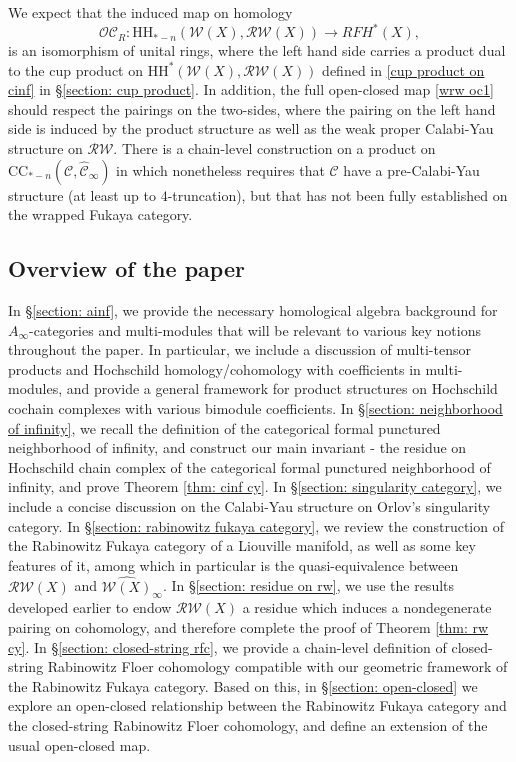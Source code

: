 \documentclass[11pt]{amsproc}
\def\w{\mathcal{W}(E)}
\def\cc{\mathcal{C}}
\def\oc{\mathcal{OC}}
\def\r#1{\mathrm{#1}}
\def\w{\mathcal{W}}
\def\rw{\mathcal{RW}}
\def\ainf{A_\infty}
\def\cinf{\widehat{\cc}_{\infty}}
\theoremstyle{remark}
\numberwithin{equation}{section}
\begin{document}
We expect that the induced map on homology 
\begin{equation}
\oc_{R}: \r{HH}_{*-n}(\w(X), \rw(X)) \to RFH^{*}(X),
\end{equation}
is an isomorphism of unital rings,
where the left hand side carries a product dual to the cup product on $\r{HH}^{*}(\w(X), \rw(X))$ defined in \eqref{cup product on cinf} in \S\ref{section: cup product}.
In addition, the full open-closed map \eqref{wrw oc1} should respect the pairings on the two-sides,
where the pairing on the left hand side is induced by the product structure as well as the weak proper Calabi-Yau structure on $\rw$.
There is a chain-level construction on a product on $\r{CC}_{*-n}(\cc, \cinf)$ in \cite{rivera-takeda-wang} which nonetheless requires that $\cc$ have a pre-Calabi-Yau structure (at least up to $4$-truncation),
but that has not been fully established on the wrapped Fukaya category.

\subsection*{Overview of the paper}

In \S\ref{section: ainf}, we provide the necessary homological algebra background for $\ainf$-categories and multi-modules that will be relevant to various key notions throughout the paper.
In particular, we include a discussion of multi-tensor products and Hochschild homology/cohomology with coefficients in multi-modules,
and provide a general framework for product structures on Hochschild cochain complexes with various bimodule coefficients.
In \S\ref{section: neighborhood of infinity}, we recall the definition of the categorical formal punctured neighborhood of infinity, 
and construct our main invariant - the residue on Hochschild chain complex of the categorical formal punctured neighborhood of infinity,
and prove Theorem \ref{thm: cinf cy}.
In \S\ref{section: singularity category}, we include a concise discussion on the Calabi-Yau structure on Orlov's singularity category.
In \S\ref{section: rabinowitz fukaya category}, we review the construction of the Rabinowitz Fukaya category of a Liouville manifold,
as well as some key features of it, among which in particular is the quasi-equivalence between $\rw(X)$ and $\widehat{\w(X)}_{\infty}$. 
In \S\ref{section: residue on rw}, we use the results developed earlier to endow $\rw(X)$ a residue which induces a nondegenerate pairing on cohomology,
and therefore complete the proof of Theorem \ref{thm: rw cy}.
In \S\ref{section: closed-string rfc}, we provide a chain-level definition of closed-string Rabinowitz Floer cohomology compatible with our geometric framework of the Rabinowitz Fukaya category.
Based on this,  in \S\ref{section: open-closed} we explore an open-closed relationship between the Rabinowitz Fukaya category and the closed-string Rabinowitz Floer cohomology,
and define an extension of the usual open-closed map.
\end{document}
